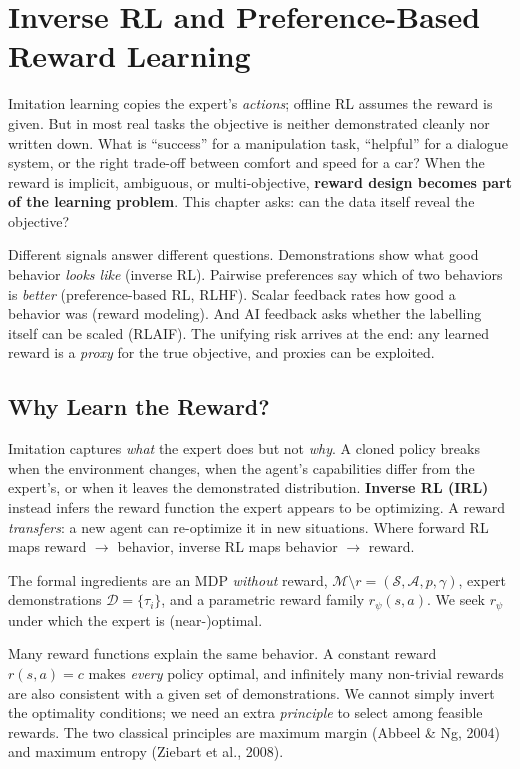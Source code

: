 \documentclass[11pt, oneside]{book}
\newcommand{\dataset}{\mathcal{D}}       %
\newcommand{\Sset}{\mathcal{S}}          %
\newcommand{\Aset}{\mathcal{A}}          %
\begin{document}
\chapter{Inverse RL and Preference-Based Reward Learning}
\label{chap:irl}

Imitation learning copies the expert's \emph{actions}; offline RL assumes the reward is
given. But in most real tasks the objective is neither demonstrated cleanly nor written
down. What is ``success'' for a manipulation task, ``helpful'' for a dialogue system,
or the right trade-off between comfort and speed for a car? When the reward is implicit,
ambiguous, or multi-objective, \textbf{reward design becomes part of the learning
problem}. This chapter asks: can the data itself reveal the objective?

Different signals answer different questions. Demonstrations show what good behavior
\emph{looks like} (inverse RL). Pairwise preferences say which of two behaviors is
\emph{better} (preference-based RL, RLHF). Scalar feedback rates how good a behavior was
(reward modeling). And AI feedback asks whether the labelling itself can be scaled
(RLAIF). The unifying risk arrives at the end: any learned reward is a \emph{proxy} for
the true objective, and proxies can be exploited.

\section{Why Learn the Reward?}

Imitation captures \emph{what} the expert does but not \emph{why}. A cloned policy
breaks when the environment changes, when the agent's capabilities differ from the
expert's, or when it leaves the demonstrated distribution. \textbf{Inverse RL (IRL)}
instead infers the reward function the expert appears to be optimizing. A reward
\emph{transfers}: a new agent can re-optimize it in new situations. Where forward RL maps
reward $\to$ behavior, inverse RL maps behavior $\to$ reward.

The formal ingredients are an MDP \emph{without} reward,
$\mathcal{M}\setminus r = (\Sset, \Aset, p, \gamma)$, expert demonstrations
$\dataset = \{\tau_i\}$, and a parametric reward family $r_\psi(s,a)$. We seek $r_\psi$
under which the expert is (near-)optimal.

\begin{notebox}[title={IRL is ill-posed}]
Many reward functions explain the same behavior. A constant reward $r(s,a)=c$ makes
\emph{every} policy optimal, and infinitely many non-trivial rewards are also consistent
with a given set of demonstrations. We cannot simply invert the optimality conditions;
we need an extra \emph{principle} to select among feasible rewards. The two classical
principles are maximum margin (Abbeel \& Ng, 2004) and maximum entropy (Ziebart et al.,
2008).
\end{notebox}
\end{document}
